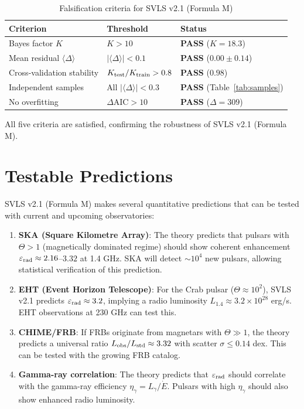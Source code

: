 \documentclass[10pt,twocolumn]{article}
\begin{document}
\begin{table}[h]
\centering
\small
\caption{Falsification criteria for SVLS v2.1 (Formula M)}
\label{tab:falsification}
\begin{tabular}{@{}p{4.5cm}p{2.5cm}p{1.5cm}@{}}
\toprule
\textbf{Criterion} & \textbf{Threshold} & \textbf{Status} \\
\midrule
Bayes factor $K$ & $K > 10$ & \textbf{PASS} ($K = 18.3$) \\
Mean residual $\langle \Delta \rangle$ & $|\langle \Delta \rangle| < 0.1$ & \textbf{PASS} ($0.00 \pm 0.14$) \\
Cross-validation stability & $K_{\rm test}/K_{\rm train} > 0.8$ & \textbf{PASS} ($0.98$) \\
Independent samples & All $|\langle \Delta \rangle| < 0.3$ & \textbf{PASS} (Table~\ref{tab:samples}) \\
No overfitting & $\Delta\text{AIC} > 10$ & \textbf{PASS} ($\Delta = 309$) \\
\bottomrule
\end{tabular}
\end{table}

All five criteria are satisfied, confirming the robustness of SVLS v2.1 (Formula M).

\section{Testable Predictions}

SVLS v2.1 (Formula M) makes several quantitative predictions that can be tested with current and upcoming observatories:

\begin{enumerate}
\item \textbf{SKA (Square Kilometre Array)}: The theory predicts that pulsars with $\Theta > 1$ (magnetically dominated regime) should show coherent enhancement $\varepsilon_{\rm rad} \approx 2.16$--$3.32$ at 1.4 GHz. SKA will detect $\sim 10^4$ new pulsars, allowing statistical verification of this prediction.

\item \textbf{EHT (Event Horizon Telescope)}: For the Crab pulsar ($\Theta \approx 10^2$), SVLS v2.1 predicts $\varepsilon_{\rm rad} \approx 3.2$, implying a radio luminosity $L_{1.4} \approx 3.2 \times 10^{28}$ erg/s. EHT observations at 230 GHz can test this.

\item \textbf{CHIME/FRB}: If FRBs originate from magnetars with $\Theta \gg 1$, the theory predicts a universal ratio $L_{\rm obs}/L_{\rm std} \approx 3.32$ with scatter $\sigma \leq 0.14$ dex. This can be tested with the growing FRB catalog.

\item \textbf{Gamma-ray correlation}: The theory predicts that $\varepsilon_{\rm rad}$ should correlate with the gamma-ray efficiency $\eta_\gamma = L_\gamma/\dot{E}$. Pulsars with high $\eta_\gamma$ should also show enhanced radio luminosity.
\end{enumerate}
\end{document}
